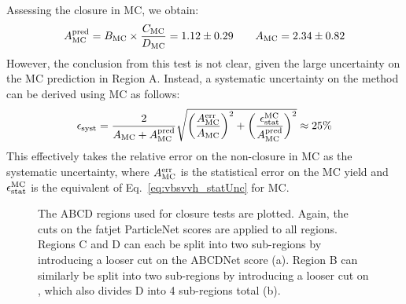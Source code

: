 Assessing the closure in MC, we obtain:
\begin{equation*}
    \AMCPred = \BMC\times\frac{\CMC}{\DMC} = 1.12\pm0.29 \qquad \AMC = 2.34\pm0.82 %
\end{equation*}
\noindent However, the conclusion from this test is not clear, given the large uncertainty on the MC prediction in Region A. 
Instead, a systematic uncertainty on the method \Esyst can be derived using MC as follows:
\begin{equation}
    \Esyst = 
        \frac{2}{\AMC + \AMCPred}
        \sqrt{\bigg(\frac{\AMC^\text{err}}{\AMC}\bigg)^2 + \bigg(\frac{\Estat^\mathrm{MC}}{\AMCPred}\bigg)^2} \approx 25\% %
\end{equation}
\noindent This effectively takes the relative error on the non-closure in MC as the systematic uncertainty, where $A_{\mathrm{MC}}^\text{err}$ is the statistical error on the MC yield and $\epsilon_{\text{stat}}^\mathrm{MC}$ is the equivalent of Eq.~\ref{eq:vbsvvh_statUnc} for MC.

\begin{figure}[htb]
    \centering
    \qquad
    \caption{
        The ABCD regions used for closure tests are plotted. 
        Again, the cuts on the fatjet ParticleNet scores are applied to all regions. 
        Regions C and D can each be split into two sub-regions by introducing a looser cut on the ABCDNet score (a). 
        Region B can similarly be split into two sub-regions by introducing a looser cut on \detajj, which also divides D into 4 sub-regions total (b).
    }
    \label{fig:vbsvvh_abcd_extra}
\end{figure}

